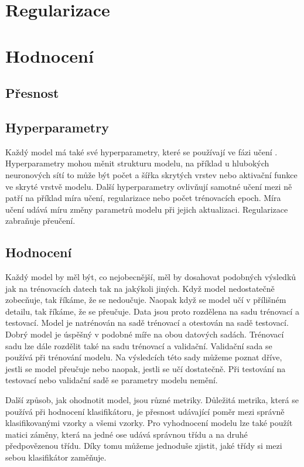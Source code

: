 \documentclass[FM,BP]{tulthesis}
\begin{document}
\section{Regularizace}
\section{Hodnocení}
\subsection{Přesnost}

\subsection{Hyperparametry}
Každý model má také své hyperparametry, které se používají ve fázi učení \cite{leonel_2019}. Hyperparametry mohou měnit strukturu modelu, na příklad u hlubokých neuronových sítí to může být počet a šířka skrytých vrstev nebo aktivační funkce ve skryté vrstvě modelu. Další hyperparametry ovlivňují samotné učení mezi ně patří na příklad míra učení, regularizace nebo počet trénovacích epoch. Míra učení udává míru změny parametrů modelu při jejich aktualizaci. Regularizace zabraňuje přeučení.

\subsection{Hodnocení}
Každý model by měl být, co nejobecnější, měl by dosahovat podobných výsledků jak na trénovacích datech tak na jakýkoli jiných. Když model nedostatečně zobecňuje, tak říkáme, že se nedoučuje. Naopak když se model učí v přílišném detailu, tak říkáme, že se přeučuje. Data jsou proto rozdělena na sadu trénovací a testovací. Model je natrénován na sadě trénovací a otestován na sadě testovací. Dobrý model je úspěšný v podobné míře na obou datových sadách. Trénovací sadu lze dále rozdělit také na sadu trénovací a validační. Validační sada se používá při trénování modelu. Na výsledcích této sady můžeme poznat dříve, jestli se model přeučuje nebo naopak, jestli se učí dostatečně. Při testování na testovací nebo validační sadě se parametry modelu nemění.

Další způsob, jak ohodnotit model, jsou různé metriky. Důležitá metrika, která se používá při hodnocení klasifikátoru, je přesnost udávající poměr mezi správně klasifikovanými vzorky a všemi vzorky. Pro vyhodnocení modelu lze také použít matici záměny, která na jedné ose udává správnou třídu a na druhé předpovězenou třídu. Díky tomu můžeme jednoduše zjistit, jaké třídy si mezi sebou klasifikátor zaměňuje.
\end{document}
